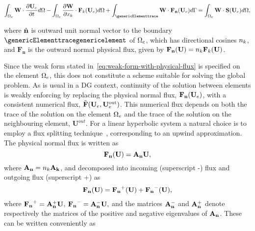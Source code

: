 \begin{equation}
\int_{\genericElement} \TF \cdot \uet \delem  - \int_{\genericElement} \dpart{\TF}{\xk} \cdot
\Flux_{k}(\Ue) \delem + \int_{\genericElementtrace} \TF \cdot \NormalFlux(\Ue) \delemtrace
= \int_{\genericElement} \TF \cdot \maxwellSource(\Ue) \delem,
\label{eq:weak-form-with-physical-flux}
\end{equation}

where $\hat{\mathbf{n}}$ is outward unit normal vector to the boundary $\genericElementtracegenericelement$ of $\Omega_e$, which has directional cosines $n_{k}$, and $\mathbf{F_n}$ is the outward normal physical flux, given by $ \mathbf{F_n}(\mathbf{U}) = n_{k} \mathbf{F}_k(\mathbf{U}) $.

Since the weak form stated in~\eqref{eq:weak-form-with-physical-flux} is specified on the element $\Omega_e$, this does not constitute a scheme suitable for solving the global problem. As is usual in a DG context, continuity of the solution between elements is weakly enforcing by replacing the physical normal flux, $\mathbf{\mathbf{F}_n}(\mathbf{U}_e)$, with a consistent numerical flux, $\tilde{\mathbf{F}}(\mathbf{U}_e,\mathbf{U}_e^{\textrm{out}})$. This numerical flux depends on both the trace of the solution on the element $\Omega_e$ and the trace of the solution on the neighbouring element, $\mathbf{U}^{out}$.
For a linear hyperbolic system a natural choice is to employ a flux splitting technique~\cite{donea2003finite}, corresponding to an upwind approximation\cite{chen2005high}.
The physical normal flux is written as
$$
\mathbf{\mathbf{F}_n}(\mathbf{U}) = \mathbf{A}_\mathbf{n} \mathbf{U},
$$
where $\mathbf{A}_\mathbf{n} = n_{k} \mathbf{A}_\mathbf{k}$, and decomposed into incoming (superscript -) flux and outgoing flux (superscript +) as
\begin{align}
\mathbf{\mathbf{F}_n}(\mathbf{U}) = \mathbf{\mathbf{F}_n}^+(\mathbf{U}) + \mathbf{\mathbf{F}_n}^-(\mathbf{U}),
\label{eq:phys-flux-splitting}
\end{align}
where $ \mathbf{\mathbf{F}_n}^+ = \mathbf{A}_\mathbf{n}^{+} \mathbf{U}$, $\mathbf{\mathbf{F}_n}^- = \mathbf{A}_\mathbf{n}^{-} \mathbf{U}, $ and the matrices $\mathbf{A}_\mathbf{n}^{-}$ and $\mathbf{A}_\mathbf{n}^{+}$ denote respectively the matrices of the positive and negative eigenvalues of $\mathbf{A}_\mathbf{n}$. These can be written conveniently as
